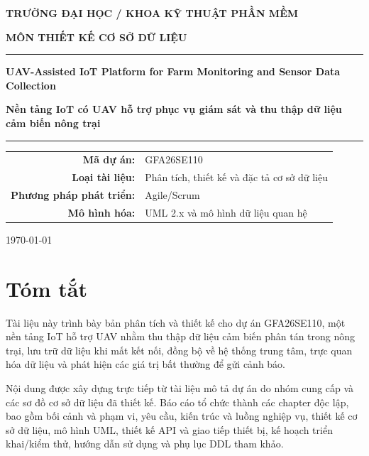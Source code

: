 \documentclass[12pt,a4paper,oneside]{report}
\begin{document}
\begin{titlepage}
\centering
\vspace*{1cm}
{\Large\bfseries TRƯỜNG ĐẠI HỌC / KHOA KỸ THUẬT PHẦN MỀM\par}
\vspace{1.0cm}
{\Large\bfseries MÔN THIẾT KẾ CƠ SỞ DỮ LIỆU\par}
\vspace{1.5cm}
\rule{\textwidth}{1pt}\par
\vspace{0.5cm}
{\Huge\bfseries UAV-Assisted IoT Platform for Farm Monitoring and Sensor Data Collection\par}
\vspace{0.5cm}
{\Large\bfseries Nền tảng IoT có UAV hỗ trợ phục vụ giám sát và thu thập dữ liệu cảm biến nông trại\par}
\vspace{0.5cm}
\rule{\textwidth}{1pt}\par
\vspace{1.5cm}

\begin{tabular}{rl}
\textbf{Mã dự án:} & GFA26SE110\\
\textbf{Loại tài liệu:} & Phân tích, thiết kế và đặc tả cơ sở dữ liệu\\
\textbf{Phương pháp phát triển:} & Agile/Scrum\\
\textbf{Mô hình hóa:} & UML 2.x và mô hình dữ liệu quan hệ\\
\end{tabular}

\vfill
{\large \today\par}
\end{titlepage}

\chapter*{Tóm tắt}
Tài liệu này trình bày bản phân tích và thiết kế cho dự án GFA26SE110, một nền tảng IoT hỗ trợ UAV nhằm thu thập dữ liệu cảm biến phân tán trong nông trại, lưu trữ dữ liệu khi mất kết nối, đồng bộ về hệ thống trung tâm, trực quan hóa dữ liệu và phát hiện các giá trị bất thường để gửi cảnh báo.

Nội dung được xây dựng trực tiếp từ tài liệu mô tả dự án do nhóm cung cấp và các sơ đồ cơ sở dữ liệu đã thiết kế. Báo cáo tổ chức thành các chapter độc lập, bao gồm bối cảnh và phạm vi, yêu cầu, kiến trúc và luồng nghiệp vụ, thiết kế cơ sở dữ liệu, mô hình UML, thiết kế API và giao tiếp thiết bị, kế hoạch triển khai/kiểm thử, hướng dẫn sử dụng và phụ lục DDL tham khảo.
\end{document}
